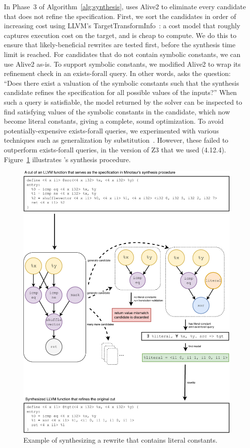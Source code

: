 In Phase~3 of Algorithm~\ref{alg:synthesis}, \minotaur{} uses Alive2 to
eliminate every candidate that does not refine the specification.
%
First, we sort the candidates in order of increasing cost using LLVM's
TargetTransformInfo~\cite{tti}: a cost model that roughly captures
execution cost on the target, and is cheap to compute.
%
We do this to ensure that likely-beneficial rewrites are tested first,
before the synthesis time limit is reached.
%
For candidates that do not contain symbolic constants, we can use
Alive2 as-is.
%
To support symbolic constants, we modified Alive2 to wrap
its refinement check in an exists-forall query.
%
In other words, \minotaur{} asks the question: ``Does there exist a
valuation of the symbolic constants such that the synthesis candidate
refines the specification for all possible values of the inputs?''
%
When such a query is satisfiable, the model returned by the solver can
be inspected to find satisfying values of the symbolic constants
in the candidate, which now become literal constants, giving a
complete, sound optimization.
%
To avoid potentially-expensive exists-forall queries, we experimented
with various techniques such as generalization by
substitution~\cite{Dutertre15}.
%
However, these failed to outperform exists-forall queries, in the
version of Z3 that we used (4.12.4).
%
Figure~\ref{fig:synthesizing} illustrates \minotaur's synthesis procedure.
\begin {figure}[tbp]
  \centering
  \includegraphics[width=\linewidth]{figures/solve_literal.pdf}
  \caption{Example of synthesizing a rewrite that contains literal constants.}
  \label{fig:synthesizing}
\end{figure}

